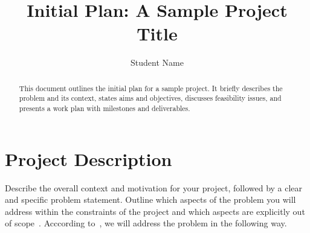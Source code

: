 \documentclass[sans,oneside,single,parskip,raggedright,numeric]{qproposal}
\title{Initial Plan: A Sample Project Title}
\author{Student Name}
\begin{document}
\maketitle

\begin{abstract}
  This document outlines the initial plan for a sample project. It briefly
  describes the problem and its context, states aims and objectives, discusses
  feasibility issues, and presents a work plan with milestones and deliverables.
\end{abstract}

%
%

\section{Project Description}

Describe the overall context and motivation for your project, followed by a
clear and specific problem statement. Outline which aspects of the problem
you will address within the constraints of the project and which aspects
are explicitly out of scope~\citep{example-paper}. Acccording
to~\citet{example-book}, we will address the problem in the following way.

%
%
\end{document}
